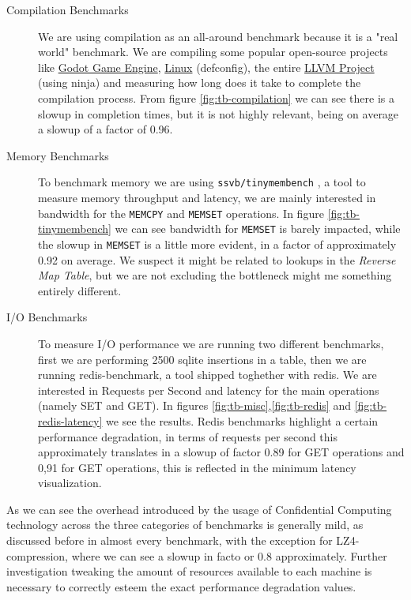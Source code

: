 \documentclass[twocolumn]{article}
\begin{document}
\begin{description}
    \item[Compilation Benchmarks] We are using compilation as an all-around benchmark because it is a "real world" benchmark. We are compiling some popular open-source projects like \href{https://github.com/godotengine/godot}{Godot Game Engine}, \href{https://git.kernel.org/pub/scm/linux/kernel/git/torvalds/linux.git}{Linux} (defconfig), the entire \href{https://github.com/llvm/llvm-project}{LLVM Project} (using ninja) and measuring how long does it take to complete the compilation process. From figure \ref{fig:tb-compilation} we can see there is a slowup in completion times, but it is not highly relevant, being on average a slowup of a factor of 0.96.
    \item[Memory Benchmarks] To benchmark memory we are using \texttt{ssvb/tinymembench} \cite{tinymembench}, a tool to measure memory throughput and latency, we are mainly interested in bandwidth for the \texttt{MEMCPY} and \texttt{MEMSET} operations. In figure \ref{fig:tb-tinymembench} we can see bandwidth for \texttt{MEMSET} is barely impacted, while the slowup in \texttt{MEMSET} is a little more evident, in a factor of approximately 0.92 on average. We suspect it might be related to lookups in the \textit{Reverse Map Table}, but we are not excluding the bottleneck might me something entirely different.
    \item[I/O Benchmarks] To measure I/O performance we are running two different benchmarks, first we are performing 2500 sqlite insertions in a table, then we are running redis-benchmark, a tool shipped toghether with redis. We are interested in Requests per Second and latency for the main operations (namely SET and GET). In figures \ref{fig:tb-misc},\ref{fig:tb-redis} and \ref{fig:tb-redis-latency} we see the results. Redis benchmarks highlight a certain performance degradation, in terms of requests per second this approximately translates in a slowup of factor 0.89 for GET operations and 0,91 for GET operations, this is reflected in the minimum latency visualization. 
\end{description}

As we can see the overhead introduced by the usage of Confidential Computing technology across the three categories of benchmarks is generally mild, as discussed before in almost every benchmark, with the exception for LZ4-compression, where we can see a slowup in facto or 0.8 approximately. Further investigation tweaking the amount of resources available to each machine is necessary to correctly esteem the exact performance degradation values.
\end{document}
